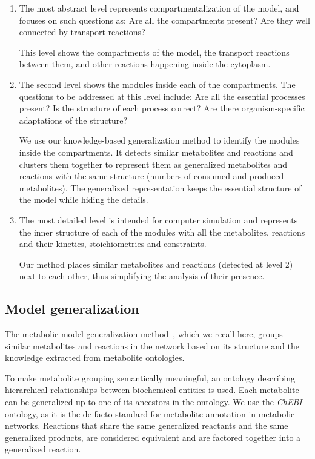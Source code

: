 \documentclass{bmcart}
\begin{document}
\begin{enumerate}
\item The most abstract level represents compartmentalization of the model, and focuses on such questions as: Are all the compartments present? Are they well connected by transport reactions?

This level shows the compartments of the model, the transport reactions between them, and other reactions happening inside the cytoplasm.

\item The second level shows the modules inside each of the compartments. The questions to be addressed at this level include: Are all the essential processes present? Is the structure of each process correct? Are there organism-specific adaptations of the structure?

We use our knowledge-based generalization method to identify the modules inside the compartments. It detects similar metabolites and reactions and clusters them together to represent them as generalized metabolites and reactions with the same structure (numbers of consumed and produced metabolites). The generalized representation keeps the essential structure of the model while hiding the details.

\item The most detailed level is intended for computer simulation and represents the inner structure of each of the modules with all the metabolites, reactions and their kinetics, stoichiometries and constraints.

Our method places similar metabolites and reactions (detected at level 2) next to each other, thus simplifying the analysis of their presence.

\end{enumerate}

\subsection*{Model generalization}
The metabolic model generalization method~\cite{Zhukova2014}, which we recall here, groups similar metabolites and reactions in the network based on its structure and the knowledge extracted from metabolite ontologies. 

To make metabolite grouping semantically meaningful, an ontology describing hierarchical relationships between biochemical entities is used. Each metabolite can be generalized up to one of its ancestors in the ontology. We use the \textit{ChEBI} ontology, as it is the de facto standard for metabolite annotation in metabolic networks. Reactions that share the same generalized reactants and the same generalized products, are considered equivalent and are factored together into a generalized reaction. 
\end{document}
